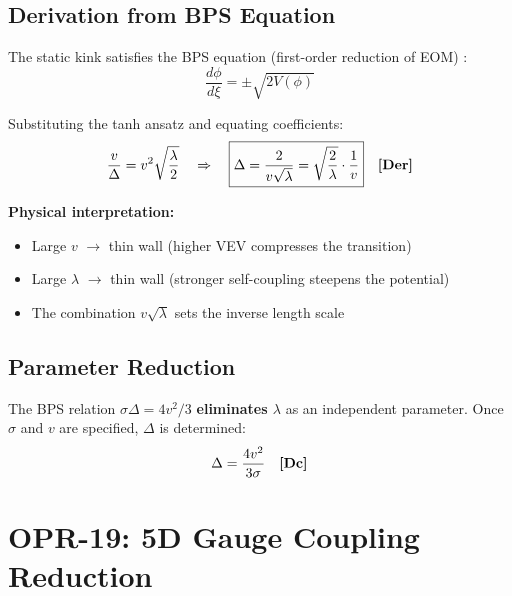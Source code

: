 \subsection{Derivation from BPS Equation}

The static kink satisfies the BPS equation (first-order reduction of EOM) \tagDer{}:
\begin{equation}
    \frac{d\phi}{d\xi} = \pm \sqrt{2 V(\phi)}
    \label{eq:opr04_BPS}
\end{equation}

Substituting the tanh ansatz and equating coefficients:
\begin{equation}
    \frac{v}{\Delta} = v^2 \sqrt{\frac{\lambda}{2}}
    \quad \Rightarrow \quad
    \boxed{\Delta = \frac{2}{v\sqrt{\lambda}} = \sqrt{\frac{2}{\lambda}} \cdot \frac{1}{v}}
    \quad \textbf{[Der]}{}
    \label{eq:opr04_result}
\end{equation}

\textbf{Physical interpretation:}
\begin{itemize}[nosep]
    \item Large $v$ $\to$ thin wall (higher VEV compresses the transition)
    \item Large $\lambda$ $\to$ thin wall (stronger self-coupling steepens the potential)
    \item The combination $v\sqrt{\lambda}$ sets the inverse length scale
\end{itemize}

\subsection{Parameter Reduction}

The BPS relation $\sigma\Delta = 4v^2/3$ \textbf{eliminates $\lambda$} as an
independent parameter. Once $\sigma$ and $v$ are specified, $\Delta$ is determined:
\begin{equation}
    \Delta = \frac{4 v^2}{3 \sigma}
    \quad \textbf{[Dc]}{}
    \label{eq:opr04_Delta_from_sigma}
\end{equation}

\section{OPR-19: 5D Gauge Coupling Reduction}
\label{sec:opr19}

